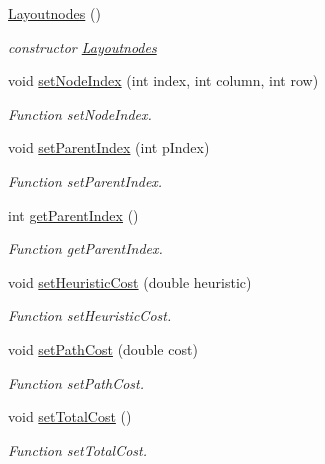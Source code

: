 \begin{DoxyCompactItemize}
\item 
\hyperlink{classLayoutnodes_a77ae660cfa6aa7b8314fa4ebc53686a9}{Layoutnodes} ()
\begin{DoxyCompactList}\small\item\em constructor \hyperlink{classLayoutnodes}{Layoutnodes} \end{DoxyCompactList}\item 
void \hyperlink{classLayoutnodes_a2aca15040dc4c9928a10b436bd49ddb4}{set\+Node\+Index} (int index, int column, int row)
\begin{DoxyCompactList}\small\item\em Function set\+Node\+Index. \end{DoxyCompactList}\item 
void \hyperlink{classLayoutnodes_a5b34895306f7ed2780fed6e0d9518a26}{set\+Parent\+Index} (int p\+Index)
\begin{DoxyCompactList}\small\item\em Function set\+Parent\+Index. \end{DoxyCompactList}\item 
int \hyperlink{classLayoutnodes_aaa5c16494f4240da90d169db0596c0b3}{get\+Parent\+Index} ()
\begin{DoxyCompactList}\small\item\em Function get\+Parent\+Index. \end{DoxyCompactList}\item 
void \hyperlink{classLayoutnodes_ab1c3b3cc9cd63a3f9356d6f74c91e65d}{set\+Heuristic\+Cost} (double heuristic)
\begin{DoxyCompactList}\small\item\em Function set\+Heuristic\+Cost. \end{DoxyCompactList}\item 
void \hyperlink{classLayoutnodes_a2b95c4f7effe08dd465aa190677a1aca}{set\+Path\+Cost} (double cost)
\begin{DoxyCompactList}\small\item\em Function set\+Path\+Cost. \end{DoxyCompactList}\item 
void \hyperlink{classLayoutnodes_a2a42eef7c888ecac08027e4c6d7e4ee2}{set\+Total\+Cost} ()
\begin{DoxyCompactList}\small\item\em Function set\+Total\+Cost. \end{DoxyCompactList}\item 

\end{DoxyCompactItemize}

